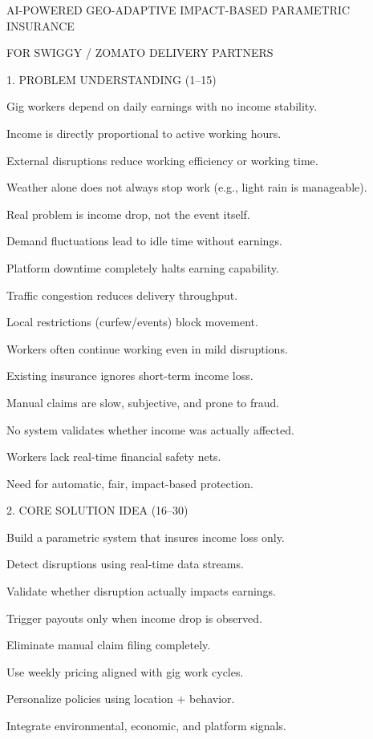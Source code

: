 AI-POWERED GEO-ADAPTIVE IMPACT-BASED PARAMETRIC INSURANCE 

        FOR SWIGGY / ZOMATO DELIVERY PARTNERS 

 

 1. PROBLEM UNDERSTANDING (1–15) 

Gig workers depend on daily earnings with no income stability. 

Income is directly proportional to active working hours. 

External disruptions reduce working efficiency or working time. 

Weather alone does not always stop work (e.g., light rain is manageable). 

Real problem is income drop, not the event itself. 

Demand fluctuations lead to idle time without earnings. 

Platform downtime completely halts earning capability. 

Traffic congestion reduces delivery throughput. 

Local restrictions (curfew/events) block movement. 

Workers often continue working even in mild disruptions. 

Existing insurance ignores short-term income loss. 

Manual claims are slow, subjective, and prone to fraud. 

No system validates whether income was actually affected. 

Workers lack real-time financial safety nets. 

Need for automatic, fair, impact-based protection. 

 

 2. CORE SOLUTION IDEA (16–30) 

Build a parametric system that insures income loss only. 

Detect disruptions using real-time data streams. 

Validate whether disruption actually impacts earnings. 

Trigger payouts only when income drop is observed. 

Eliminate manual claim filing completely. 

Use weekly pricing aligned with gig work cycles. 

Personalize policies using location + behavior. 

Integrate environmental, economic, and platform signals. 

